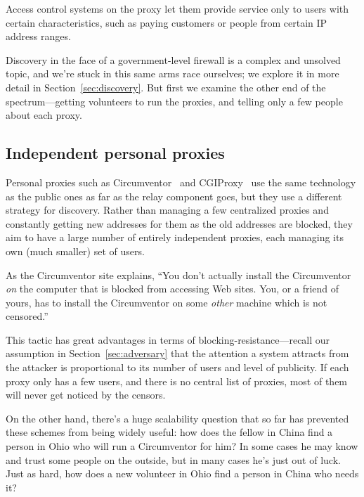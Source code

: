 \documentclass{llncs}
\begin{document}
Access control systems on the proxy let them provide service only to
users with certain characteristics, such as paying customers or people
from certain IP address ranges.

Discovery in the face of a government-level firewall is a complex and
unsolved
topic, and we're stuck in this same arms race ourselves; we explore it
in more detail in Section~\ref{sec:discovery}. But first we examine the
other end of the spectrum---getting volunteers to run the proxies,
and telling only a few people about each proxy.

\subsection{Independent personal proxies}

Personal proxies such as Circumventor~\cite{circumventor} and
CGIProxy~\cite{cgiproxy} use the same technology as the public ones as
far as the relay component goes, but they use a different strategy for
discovery. Rather than managing a few centralized proxies and constantly
getting new addresses for them as the old addresses are blocked, they
aim to have a large number of entirely independent proxies, each managing
its own (much smaller) set of users.

As the Circumventor site explains, ``You don't
actually install the Circumventor \emph{on} the computer that is blocked
from accessing Web sites. You, or a friend of yours, has to install the
Circumventor on some \emph{other} machine which is not censored.''

This tactic has great advantages in terms of blocking-resistance---recall
our assumption in Section~\ref{sec:adversary} that the attention
a system attracts from the attacker is proportional to its number of
users and level of publicity. If each proxy only has a few users, and
there is no central list of proxies, most of them will never get noticed by
the censors.

On the other hand, there's a huge scalability question that so far has
prevented these schemes from being widely useful: how does the fellow
in China find a person in Ohio who will run a Circumventor for him? In
some cases he may know and trust some people on the outside, but in many
cases he's just out of luck. Just as hard, how does a new volunteer in
Ohio find a person in China who needs it?

\end{document}
